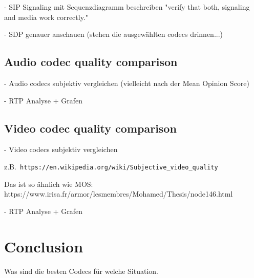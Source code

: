 \documentclass[parskip=full]{scrartcl}
\begin{document}
- SIP Signaling mit Sequenzdiagramm beschreiben "verify that both, signaling and media work correctly."

- SDP genauer anschauen (stehen die ausgewählten codecs drinnen...)

\subsection{Audio codec quality comparison} \label{subsec:audio}
- Audio codecs subjektiv  vergleichen (vielleicht nach der Mean Opinion Score)

- RTP Analyse + Grafen
\subsection{Video codec quality comparison} \label{subsec:video}
- Video codecs subjektiv vergleichen  

z.B.\verb| https://en.wikipedia.org/wiki/Subjective_video_quality | 
  
Das ist so ähnlich wie MOS:
https://www.irisa.fr/armor/lesmembres/Mohamed/Thesis/node146.html

- RTP Analyse + Grafen
\section{Conclusion}

Was sind die besten Codecs für welche Situation. 

\printbibliography
\end{document}
